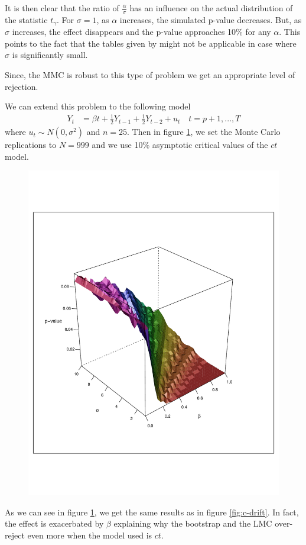 \documentclass[11pt]{article}\usepackage[]{graphicx}\usepackage[]{color}
\begin{document}
It is then clear that the ratio of $\frac{\alpha}{\sigma}$ has an influence on the actual distribution of the statistic $t_\gamma$. For $\sigma=1$, as $\alpha$ increases, the simulated p-value decreases. But, as $\sigma$ increases, the effect disappears and the p-value approaches 10\% for any $\alpha$. This points to the fact that the tables given by \cite{fuller_introduction_1976} might not be applicable in case where $\sigma$ is significantly small.

Since, the MMC is robust to this type of problem we get an appropriate level of rejection.

We can extend this problem to the following model
\begin{align}
	Y_t & = \beta t + \frac{1}{2}Y_{t-1} + \frac{1}{2}Y_{t-2} + u_t \quad t = p + 1, ... , T
\end{align}
where $u_t \sim N(0,\sigma^2)$ and $n=25$. Then in figure \ref{fig:ct-trend}, we set the Monte Carlo replications to $N=999$ and we use 10\% asymptotic critical values of the $ct$ model.

\begin{figure}[H]
	\centering
	\includegraphics[width=0.7\linewidth]{fig/ct-trend}
	\caption{}
	\label{fig:ct-trend}
\end{figure}

As we can see in figure \ref{fig:ct-trend}, we get the same results as in figure \ref{fig:c-drift}. In fact, the effect is exacerbated by $\beta$ explaining why the bootstrap and the LMC over-reject even more when the model used is $ct$.
\end{document}
